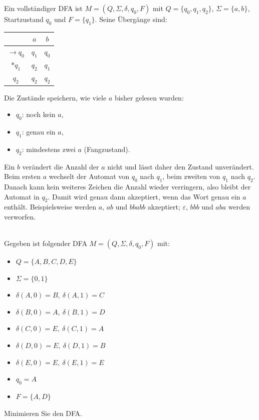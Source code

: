 \begin{loesung}
Ein vollständiger DFA ist $M=(Q,\Sigma,\delta,q_0,F)$ mit
$Q=\{q_0,q_1,q_2\}$, $\Sigma=\{a,b\}$, Startzustand $q_0$ und
$F=\{q_1\}$. Seine Übergänge sind:
\begin{center}
\begin{tabular}{c|cc}
 & $a$ & $b$\\\hline
$\to q_0$ & $q_1$ & $q_0$\\
$*q_1$ & $q_2$ & $q_1$\\
$q_2$ & $q_2$ & $q_2$
\end{tabular}
\end{center}
Die Zustände speichern, wie viele $a$ bisher gelesen wurden:
\begin{itemize}
  \item $q_0$: noch kein $a$,
  \item $q_1$: genau ein $a$,
  \item $q_2$: mindestens zwei $a$ (Fangzustand).
\end{itemize}
Ein $b$ verändert die Anzahl der $a$ nicht und lässt daher den Zustand
unverändert. Beim ersten $a$ wechselt der Automat von $q_0$ nach $q_1$,
beim zweiten von $q_1$ nach $q_2$. Danach kann kein weiteres Zeichen die
Anzahl wieder verringern, also bleibt der Automat in $q_2$.
Damit wird genau dann akzeptiert, wenn das Wort genau ein $a$ enthält.
Beispielsweise werden $a$, $ab$ und $bbabb$ akzeptiert;
$\varepsilon$, $bbb$ und $aba$ werden verworfen.
\end{loesung}

\\
Gegeben ist folgender DFA $M = (Q, \Sigma, \delta, q_0, F)$ mit:
\begin{itemize}
    \item $Q = \{A, B, C, D, E\}$
    \item $\Sigma = \{0,1\}$
    \item $\delta(A,0)=B,\ \delta(A,1)=C$
    \item $\delta(B,0)=A,\ \delta(B,1)=D$
    \item $\delta(C,0)=E,\ \delta(C,1)=A$
    \item $\delta(D,0)=E,\ \delta(D,1)=B$
    \item $\delta(E,0)=E,\ \delta(E,1)=E$
    \item $q_0 = A$
    \item $F = \{A, D\}$
\end{itemize}
Minimieren Sie den DFA.

